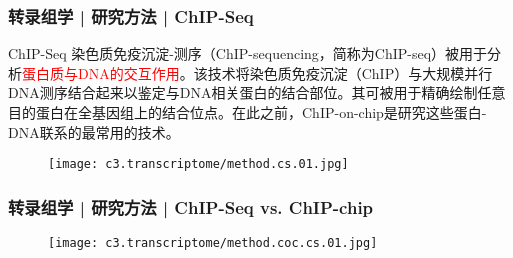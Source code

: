 \begin{frame}
  \frametitle{转录组学 | 研究方法 | ChIP-Seq}
  {\footnotesize
  \begin{block}{ChIP-Seq}
    染色质免疫沉淀-测序（ChIP-sequencing，简称为ChIP-seq）被用于分析\textcolor{red}{蛋白质与DNA的交互作用}。该技术将染色质免疫沉淀（ChIP）与大规模并行DNA测序结合起来以鉴定与DNA相关蛋白的结合部位。其可被用于精确绘制任意目的蛋白在全基因组上的结合位点。在此之前，ChIP-on-chip是研究这些蛋白-DNA联系的最常用的技术。
  \end{block}
  }
  \begin{figure}
    \centering
    \texttt{[image: c3.transcriptome/method.cs.01.jpg]}
  \end{figure}
\end{frame}

\begin{frame}
  \frametitle{转录组学 | 研究方法 | ChIP-Seq vs. ChIP-chip}
  \begin{figure}
    \centering
    \texttt{[image: c3.transcriptome/method.coc.cs.01.jpg]}
  \end{figure}
\end{frame}
